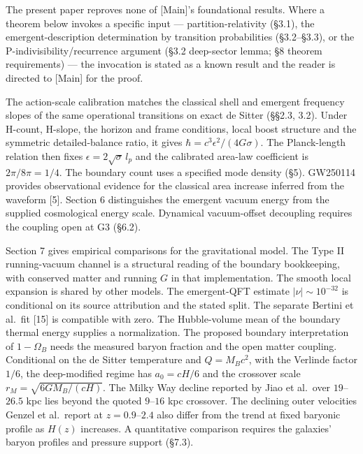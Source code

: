 \documentclass[
]{article}
\begin{document}
The present paper reproves none of {[}Main{]}'s foundational results.
Where a theorem below invokes a specific input --- partition-relativity
(§3.1), the emergent-description determination by transition
probabilities (§3.2--§3.3), or the P-indivisibility/recurrence argument
(§3.2 deep-sector lemma; §8 theorem requirements) --- the invocation is
stated as a known result and the reader is directed to {[}Main{]} for
the proof.

The action-scale calibration matches the classical shell and emergent
frequency slopes of the same operational transitions on exact de Sitter
(§§2.3, 3.2). Under H-count, H-slope, the horizon and frame conditions,
local boost structure and the symmetric detailed-balance ratio, it gives
\(\hbar=c^3\epsilon^2/(4G\sigma)\). The Planck-length relation then
fixes \(\epsilon=2\sqrt{\sigma}\,l_p\) and the calibrated area-law
coefficient is \(2\pi/8\pi=1/4\). The boundary count uses a specified
mode density (§5). GW250114 provides observational evidence for the
classical area increase inferred from the waveform {[}5{]}. Section 6
distinguishes the emergent vacuum energy from the supplied cosmological
energy scale. Dynamical vacuum-offset decoupling requires the coupling
open at G3 (§6.2).

Section 7 gives empirical comparisons for the gravitational model. The
Type II running-vacuum channel is a structural reading of the boundary
bookkeeping, with conserved matter and running \(G\) in that
implementation. The smooth local expansion is shared by other models.
The emergent-QFT estimate \(|\nu|\sim10^{-32}\) is conditional on its
source attribution and the stated split. The separate Bertini et al.~fit
{[}15{]} is compatible with zero. The Hubble-volume mean of the boundary
thermal energy supplies a normalization. The proposed boundary
interpretation of \(1-\Omega_B\) needs the measured baryon fraction and
the open matter coupling. Conditional on the de Sitter temperature and
\(Q=M_Bc^2\), with the Verlinde factor \(1/6\), the deep-modified regime
has \(a_0=cH/6\) and the crossover scale \(r_M=\sqrt{6GM_B/(cH)}\). The
Milky Way decline reported by Jiao et al.~over \(19\)--\(26.5\) kpc lies
beyond the quoted \(9\)--\(16\) kpc crossover. The declining outer
velocities Genzel et al.~report at \(z=0.9\)--\(2.4\) also differ from
the trend at fixed baryonic profile as \(H(z)\) increases. A
quantitative comparison requires the galaxies' baryon profiles and
pressure support (§7.3).
\end{document}

